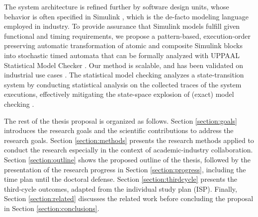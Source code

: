 The system architecture is refined further by software design units, whose behavior is often specified in Simulink \cite{JamesB.Dabney2003MasteringSimulink}, which is the de-facto modeling language employed in industry.  To provide assurance that Simulink models fulfill given functional and timing requirements, we propose a pattern-based, execution-order preserving automatic transformation of atomic and composite Simulink blocks into stochastic timed automata that can be formally analyzed with UPPAAL Statistical Model Checker \cite{Bulychev2012UPPAAL-SMC:Automata}. Our method is scalable, and has been validated on industrial use cases \cite{Filipovikj2016SimulinkSystems}. The statistical model checking analyzes a state-transition system by conducting statistical analysis on the collected traces of the system executions, effectively mitigating the state-space explosion of (exact) model checking \cite{Legay2010StatisticalOverview}. 

The rest of the thesis proposal is organized as follows. Section \ref{section:goals} introduces the research goals and the scientific contributions to address the research goals. Section \ref{section:methods} presents the research methods applied to conduct the research especially in the context of academic-industry collaboration. Section \ref{section:outline} shows the proposed outline of the thesis, followed by the presentation of the research progress in Section \ref{section:progress}, including the time plan until the doctoral defense. Section \ref{section:thirdcycle} presents the third-cycle outcomes, adapted from the individual study plan (ISP). Finally, Section \ref{section:related} discusses the related work before concluding the proposal in Section \ref{section:conclusions}.
